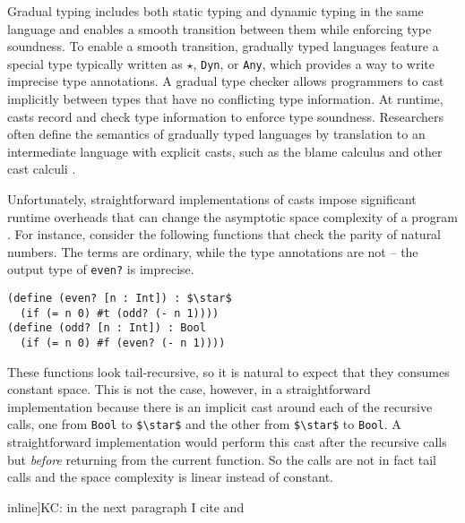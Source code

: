 \documentclass[runningheads]{llncs}
\newcommand{\todo}[1]{}
\newcommand{\Tdyn}[0]{\ensuremath{\star}}
\begin{document}
Gradual typing \citep{siek2006gradual,siek2015refined} includes both static typing 
and dynamic typing in the same language and enables a smooth transition between them while
enforcing type soundness.
To enable a smooth transition, gradually typed languages feature a special type
typically written as \Tdyn{}, \lstinline|Dyn|, or \lstinline|Any|, which
provides a way to write imprecise type annotations. A gradual type checker allows programmers to cast 
implicitly between types that have no conflicting type information.
At runtime, casts record and check type information to enforce type soundness.
Researchers often define the semantics of gradually typed languages by
translation to an intermediate language with explicit casts, such as the blame
calculus \citep{wadler2009well} and other cast calculi \citep{siek2009exploring}.

Unfortunately, straightforward implementations of casts impose significant 
runtime overheads that can change the asymptotic space complexity of a program 
\citep{herman2010space}.
For instance, consider the following functions 
that check the parity of natural numbers. The terms are ordinary, while the 
type annotations are not -- the output type of \lstinline|even?| is 
imprecise.
\begin{lstlisting}
(define (even? [n : Int]) : $\star$
  (if (= n 0) #t (odd? (- n 1))))
(define (odd? [n : Int]) : Bool
  (if (= n 0) #f (even? (- n 1))))
\end{lstlisting}
These functions look tail-recursive, so it is natural to expect that
they consumes constant space. This is not the case, however, in a
straightforward implementation because there is an implicit cast
around each of the recursive calls, one from \lstinline|Bool| to
\lstinline|$\star$| and the other from \lstinline|$\star$| to
\lstinline|Bool|.  A straightforward implementation would perform this
cast after the recursive calls but \textit{before} returning from the
current function. So the calls are not in fact tail calls and the
space complexity is linear instead of constant.

\todo[inline]{KC: in the next paragraph I cite \cite{breazu1991inheritance}
and \cite{breazu1990computing}}
\end{document}
